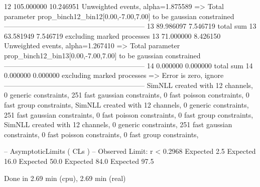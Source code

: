 12         105.000000      10.246951       Unweighted events, alpha=1.875589
  => Total parameter prop_binch12_bin12[0.00,-7.00,7.00] to be gaussian constrained
------------------------------------------------------------
13         89.986097       7.546719        total sum                     
13         63.581949       7.546719        excluding marked processes    
13         71.000000       8.426150        Unweighted events, alpha=1.267410
  => Total parameter prop_binch12_bin13[0.00,-7.00,7.00] to be gaussian constrained
------------------------------------------------------------
14         0.000000        0.000000        total sum                     
14         0.000000        0.000000        excluding marked processes    
  => Error is zero, ignore      
------------------------------------------------------------
SimNLL created with 12 channels, 0 generic constraints, 251 fast gaussian constraints, 0 fast poisson constraints, 0 fast group constraints, 
SimNLL created with 12 channels, 0 generic constraints, 251 fast gaussian constraints, 0 fast poisson constraints, 0 fast group constraints, 
SimNLL created with 12 channels, 0 generic constraints, 251 fast gaussian constraints, 0 fast poisson constraints, 0 fast group constraints, 

 -- AsymptoticLimits ( CLs ) --
Observed Limit: r < 0.2968
Expected  2.5%
Expected 16.0%
Expected 50.0%
Expected 84.0%
Expected 97.5%

Done in 2.69 min (cpu), 2.69 min (real)
